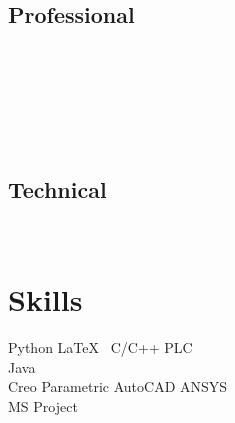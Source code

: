 \documentclass[a4paper]{deedy-resume-openfont}
\begin{document}
\begin{minipage}[t]{0.35\textwidth}
\subsection {Professional}
\href{https://drive.google.com/open?id=1ZSbZU2kIj9727twuL2duDpwSVcJF3Bav}{} \\
\href{https://drive.google.com/open?id=1IcJog-NhHp5I1mDOVW-tDEg96hufaOsB}{}\\
\href{https://drive.google.com/open?id=1sYfMLmblSJPoWDDE6Dm4wsnGFGnhENnn}{}\\
\href{https://drive.google.com/open?id=1nzi93be5eG2a_lCn3SCSCZEM42NhJneb}{}\\
\href{https://drive.google.com/open?id=1iVLVNTpX3ECf9c1XeJx35mZba9_CMgwA}{}\\
\sectionsep
\subsection{Technical}
\href{https://drive.google.com/file/d/1KLSy2JhKAaY0HCxHK40wRrXcqlISMnkr/view?usp=sharing}{}\\
\href{https://drive.google.com/open?id=1fRdoUniS4ihsh5xUGNR0aIYMJLfp1sYG}{}

\sectionsep


\section{Skills}

\hspace{2mm}\textbullet{} \href{https://drive.google.com/file/d/1_bFXkURunzdYNMG2vf1LhxcMa8wCrCOC/view?usp=sharing}{} \textbullet {} Python \textbullet{} \LaTeX\  
\textbullet{} C/C++ \textbullet{} PLC \\ \hspace{2mm}\textbullet{} Java \\

\hspace{2mm}\textbullet{} Creo Parametric \textbullet{} AutoCAD \textbullet{} ANSYS\\  
\hspace{2mm}\textbullet{} MS Project  \textbullet{} \href{https://drive.google.com/file/d/1v5S6pNTwMw4lWtdMukApnQxdzOTWIblV/view?usp=sharing}{} \textbullet{} \href {https://drive.google.com/open?id=1AESUhAJ6J39_PE8eDsRS3kBpl_ozGkYQ}{}\\


\end{minipage}
\end{document}
